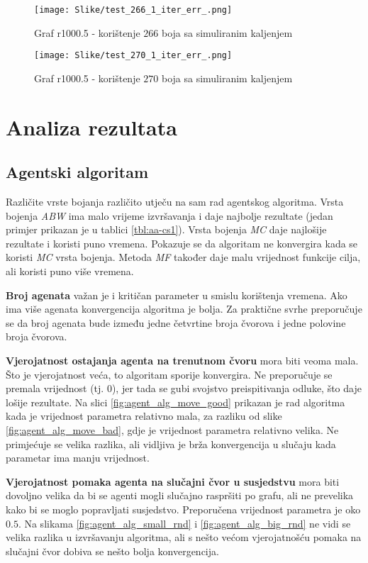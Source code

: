 \documentclass[times, utf8, diplomski, numeric]{fer}
\begin{document}
\begin{figure}[htb]
	\texttt{[image: Slike/test\_266\_1\_iter\_err\_.png]}
	\caption{Graf r1000.5 - korištenje $266$ boja sa simuliranim kaljenjem}
	\label{fig:r1000.5-266}
\end{figure}

\begin{figure}[htb]
	\texttt{[image: Slike/test\_270\_1\_iter\_err\_.png]}
	\caption{Graf r1000.5 - korištenje $270$ boja sa simuliranim kaljenjem}
	\label{fig:r1000.5-270}
\end{figure}



\section{Analiza rezultata}

\subsection{Agentski algoritam}

Različite vrste bojanja različito utječu na sam rad agentskog algoritma. Vrsta bojenja \emph{ABW} ima malo vrijeme izvršavanja i daje najbolje rezultate (jedan primjer prikazan je u tablici \ref{tbl:aa-cs1}). Vrsta bojenja \emph{MC} daje najlošije rezultate i koristi puno vremena. Pokazuje se da algoritam ne konvergira kada se koristi \emph{MC} vrsta bojenja. Metoda \emph{MF} također daje malu vrijednost funkcije cilja, ali koristi puno više vremena.

\textbf{Broj agenata} važan je i kritičan parameter u smislu korištenja vremena. Ako ima više agenata konvergencija algoritma je bolja. Za praktične svrhe preporučuje se da broj agenata bude između jedne četvrtine broja čvorova i jedne polovine broja čvorova.

\textbf{Vjerojatnost ostajanja agenta na trenutnom čvoru} mora biti veoma mala. Što je vjerojatnost veća, to algoritam sporije konvergira. Ne preporučuje se premala vrijednost (tj. $0$), jer tada se gubi svojstvo preispitivanja odluke, što daje lošije rezultate. Na slici \ref{fig:agent_alg_move_good} prikazan je rad algoritma kada je vrijednost parametra relativno mala, za razliku od slike \ref{fig:agent_alg_move_bad}, gdje je vrijednost parametra relativno velika. Ne primjećuje se velika razlika, ali vidljiva je brža konvergencija u slučaju kada parametar ima manju vrijednost.

\textbf{Vjerojatnost pomaka agenta na slučajni čvor u susjedstvu} mora biti dovoljno velika da bi se agenti mogli slučajno raspršiti po grafu, ali ne prevelika kako bi se moglo popravljati susjedstvo. Preporučena vrijednost parametra je oko $0.5$. Na slikama \ref{fig:agent_alg_small_rnd} i \ref{fig:agent_alg_big_rnd} ne vidi se velika razlika u izvršavanju algoritma, ali s nešto većom vjerojatnošću pomaka na slučajni čvor dobiva se nešto bolja konvergencija.
\end{document}
